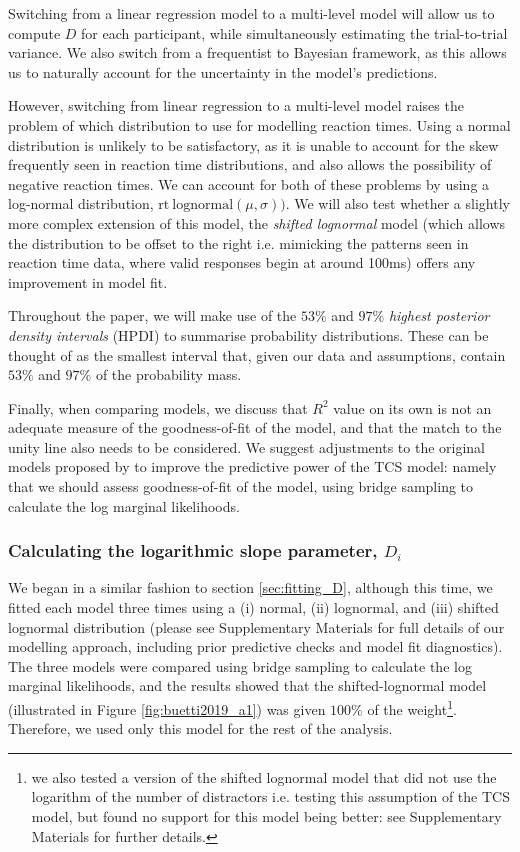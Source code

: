 \documentclass[smallextended, natbib]{svjour3}       %
\begin{document}
Switching from a linear regression model to a multi-level model will allow us to compute $D$ for each participant, while simultaneously estimating the trial-to-trial variance. We also switch from a frequentist to Bayesian framework, as this allows us to naturally account for the uncertainty in the model's predictions.

However, switching from linear regression to a multi-level model raises the problem of which distribution to use for modelling reaction times. Using a normal distribution is unlikely to be satisfactory, as it is unable to account for the skew frequently seen in reaction time distributions, and also allows the possibility of negative reaction times. We can account for both of these problems by using a log-normal distribution, $\text{rt} ~ \text{lognormal}(\mu, \sigma))$. We will also test whether a slightly more complex extension of this model, the \textit{shifted lognormal} model (which allows the distribution to be offset to the right i.e. mimicking the patterns seen in reaction time data, where valid responses begin at around 100ms) offers any improvement in model fit.

Throughout the paper, we will make use of the $53\%$ and $97\%$ \textit{highest posterior density intervals} (HPDI) to summarise probability distributions. These can be thought of as the smallest interval that, given our data and assumptions, contain $53\%$ and $97\%$ of the probability mass. 

Finally, when comparing models, we discuss that $R^2$ value on its own is not an adequate measure of the goodness-of-fit of the model, and that the match to the unity line also needs to be considered. We suggest adjustments to the original models proposed by \cite{buetti2019predicting} to improve the predictive power of the TCS model: namely that we should assess goodness-of-fit of the model, using bridge sampling to calculate the log marginal likelihoods.

\subsubsection{Calculating the logarithmic slope parameter, $D_i$}

We began in a similar fashion to section \ref{sec:fitting_D}, although this time, we fitted each model three times using a (i) normal, (ii) lognormal, and (iii) shifted lognormal distribution (please see Supplementary Materials for full details of our modelling approach, including prior predictive checks and model fit diagnostics). The three models were compared using bridge sampling to calculate the log marginal likelihoods, and the results showed that the shifted-lognormal model (illustrated in Figure \ref{fig:buetti2019_a1}) was given $100\%$ of the weight\footnote{we also tested a version of the shifted lognormal model that did not use the logarithm of the number of distractors i.e. testing this assumption of the TCS model, but found no support for this model being better: see Supplementary Materials for further details.}. Therefore, we used only this model for the rest of the analysis. 
\end{document}
